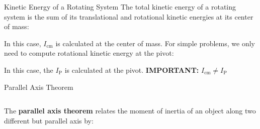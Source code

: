 \documentclass[12pt,compress,aspectratio=169]{beamer}
\begin{document}
\begin{frame}{Kinetic Energy of a Rotating System}
  The total kinetic energy of a rotating system is the sum of its translational
  and rotational kinetic energies at its center of mass:

  
  In this case, $I_\text{cm}$ is calculated at the center of
  mass. For simple problems, we only need to compute rotational kinetic energy
  at the pivot:

  
  In this case, the $I_\text{P}$ is calculated at the pivot.
  \textbf{IMPORTANT:} $I_\text{cm}\neq I_\text{P}$
\end{frame}



\begin{frame}{Parallel Axis Theorem}
  \begin{columns}
    
    The \textbf{parallel axis theorem} relates the moment of inertia of an
    object along two different but parallel axis by:

  \end{columns}
\end{frame}
\end{document}

